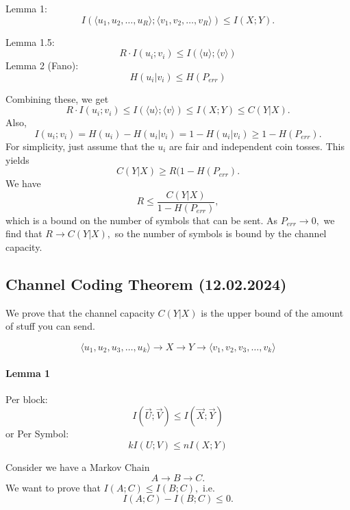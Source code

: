 \documentclass[12pt]{article}
\begin{document}
Lemma 1:
\[I(\langle u_1,u_2,\dots,u_R\rangle;\langle v_1,v_2,\dots,v_R\rangle)\le I(X;Y).\]

Lemma 1.5:
\[R\cdot I(u_i;v_i)\le I(\langle u\rangle;\langle v\rangle)\]
Lemma 2 (Fano):
\[H(u_i|v_i)\le H(P_{err})\]

Combining these, we get
\[R\cdot I(u_i;v_i)\le I(\langle u\rangle;\langle v\rangle)\le I(X;Y)\le C(Y|X).\]
Also, \[I(u_i;v_i)=H(u_i)-H(u_i|v_i)=1-H(u_i|v_i)\ge 1-H(P_{err}).\] For simplicity, just assume that the $u_i$ are fair and independent coin tosses. This yields
\[C(Y|X)\ge R(1-H(P_{err}).\] We have
\[R\le\frac{C(Y|X)}{1-H(P_{err})},\] which is a bound on the number of symbols that can be sent. As $P_{err}\to 0,$ we find that $R\to C(Y|X),$ so the number of symbols is bound by the channel capacity.


\subsection{Channel Coding Theorem (12.02.2024)}
We prove that the channel capacity $C(Y|X)$ is the upper bound of the amount of stuff you can send.


\[\langle u_1,u_2,u_3,\dots,u_k\rangle\to X\to Y\to\langle v_1,v_2,v_3,\dots,v_k\rangle\]

\paragraph{Lemma 1}
Per block:
\[I(\vec{U};\vec{V})\le I(\vec{X};\vec{Y})\]
or Per Symbol:
\[kI(U;V)\le nI(X;Y)\]

Consider we have a Markov Chain \[A \to B \to C.\]
We want to prove that 
$I(A;C)\le I(B;C),$
i.e.
\[I(A;C)-I(B;C)\le 0.\]
\end{document}
